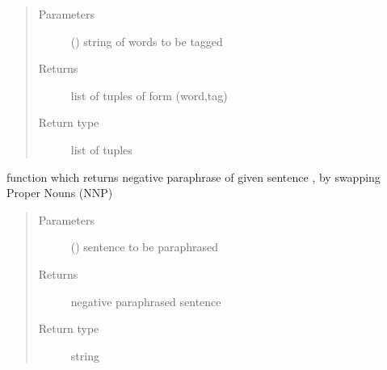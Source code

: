 \documentclass[letterpaper,10pt,english]{sphinxmanual}
\begin{document}
\begin{fulllineitems}
\begin{fulllineitems}
\begin{description}
\end{description}
\begin{quote}\begin{description}
\item[{Parameters}] \leavevmode
{} () \textendash{} string of words to be tagged

\item[{Returns}] \leavevmode
list of tuples of form (word,tag)

\item[{Return type}] \leavevmode
list of tuples

\end{description}\end{quote}

\end{fulllineitems}


\begin{fulllineitems}
\label{\detokenize{ParaphraseDatasetCreation.Hindi:ParaphraseDatasetCreation.Hindi.Negative.Negative_Paraphrases.negation_by_compound}}
function which returns negative paraphrase of given sentence , by swapping Proper Nouns (NNP)
\begin{quote}\begin{description}
\item[{Parameters}] \leavevmode
{} () \textendash{} sentence to be paraphrased

\item[{Returns}] \leavevmode
negative paraphrased sentence

\item[{Return type}] \leavevmode
string

\end{description}\end{quote}

\end{fulllineitems}



\end{fulllineitems}
\end{document}
